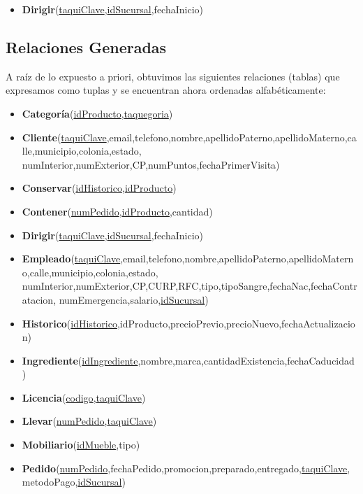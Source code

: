 \documentclass[11pt,letterpaper]{article}
\begin{document}
\begin{itemize}
\item \footnotesize{\textbf{Dirigir}(\underline{taquiClave},\underline{idSucursal},fechaInicio)}
\end{itemize}

\subsection{Relaciones Generadas}

A raíz de lo expuesto a priori, obtuvimos las siguientes relaciones (tablas) que expresamos como tuplas y se encuentran ahora ordenadas alfabéticamente:

\begin{itemize}
\item \footnotesize{\textbf{Categoría}(\underline{idProducto},\underline{taquegoria})}
\item \footnotesize{\textbf{Cliente}(\underline{taquiClave},email,telefono,nombre,apellidoPaterno,apellidoMaterno,calle,municipio,colonia,estado,
numInterior,numExterior,CP,numPuntos,fechaPrimerVisita)}
\item \footnotesize{\textbf{Conservar}(\underline{idHistorico},\underline{idProducto})}
\item \footnotesize{\textbf{Contener}(\underline{numPedido},\underline{idProducto},cantidad)}
\item \footnotesize{\textbf{Dirigir}(\underline{taquiClave},\underline{idSucursal},fechaInicio)}
\item \footnotesize{\textbf{Empleado}(\underline{taquiClave},email,telefono,nombre,apellidoPaterno,apellidoMaterno,calle,municipio,colonia,estado,
numInterior,numExterior,CP,CURP,RFC,tipo,tipoSangre,fechaNac,fechaContratacion,
numEmergencia,salario,\underline{idSucursal})}
\item \footnotesize{\textbf{Historico}(\underline{idHistorico},idProducto,precioPrevio,precioNuevo,fechaActualizacion)}
\item \footnotesize{\textbf{Ingrediente}(\underline{idIngrediente},nombre,marca,cantidadExistencia,fechaCaducidad)}
\item \footnotesize{\textbf{Licencia}(\underline{codigo},\underline{taquiClave}})
\item \footnotesize{\textbf{Llevar}(\underline{numPedido},\underline{taquiClave})}
\item \footnotesize{\textbf{Mobiliario}(\underline{idMueble},tipo)}
\item \footnotesize{\textbf{Pedido}(\underline{numPedido},fechaPedido,promocion,preparado,entregado,\underline{taquiClave},metodoPago,\underline{idSucursal})}

\end{itemize}
\end{document}
